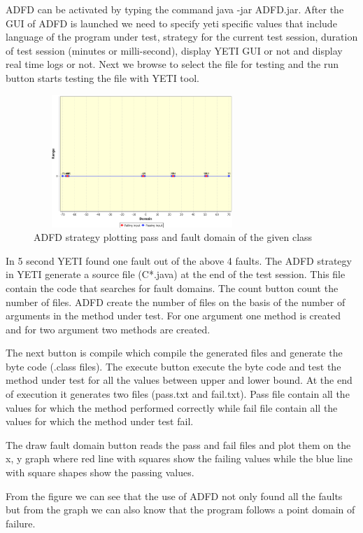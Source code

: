 \documentclass{acm_proc_article-sp}
\begin{document}
ADFD can be activated by typing the command java -jar ADFD.jar. After the GUI of ADFD is launched we need to specify yeti specific values that include language of the program under test, strategy for the current test session, duration of test session (minutes or milli-second), display YETI GUI or not and display real time logs or not. Next we browse to select the file for testing and the run button starts testing the file with YETI tool. 

\begin{figure}[ht]
\centering
\includegraphics[width=8.2cm,height=5cm]{pointDomainOneArgument.png}
\caption{ADFD strategy plotting pass and fault domain of the given class}
\label{fig:ADFD-example}
\end{figure}


In 5 second YETI found one fault out of the above 4 faults. The ADFD strategy in YETI generate a source file (C*.java) at the end of the test session. This file contain the code that searches for fault domains. The count button count the number of files. ADFD create the number of files on the basis of the number of arguments in the method under test. For one argument one method is created and for two argument two methods are created. 

The next button is compile which compile the generated files and generate the byte code (.class files). The execute button execute the byte code and test the method under test for all the values between upper and lower bound. At the end of execution it generates two files (pass.txt and fail.txt). Pass file contain all the values for which the method performed correctly while fail file contain all the values for which the method under test fail.

The draw fault domain button reads the pass and fail files and plot them on the x, y graph where red line with squares show the failing values while the blue line with square shapes show the passing values.

From the figure {} we can see that the use of ADFD not only found all the faults but from the graph we can also know that the program follows a point domain of failure.
\end{document}
